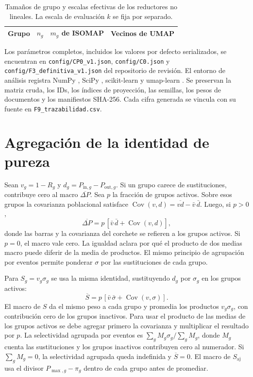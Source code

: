 \begin{table}[!htbp]
\centering
\caption{Tamaños de grupo y escalas efectivas de los reductores no lineales. La escala de evaluación $k$ se fija por separado.}
\label{tab:config}
\small
\begin{tabular}{lrrr}
\toprule
Grupo & $n_g$ & $m_g$ de ISOMAP & Vecinos de UMAP\\
\midrule

\end{tabular}
\end{table}

Los parámetros completos, incluidos los valores por defecto serializados, se encuentran en \nolinkurl{config/CP0_v1.json}, \nolinkurl{config/C0.json} y \nolinkurl{config/F3_definitiva_v1.json} del repositorio de revisión. El entorno de análisis registra NumPy , SciPy , scikit-learn  y umap-learn . Se preservan la matriz cruda, los IDs, los índices de proyección, las semillas, los pesos de documentos y los manifiestos SHA-256. Cada cifra generada se vincula con su fuente en \nolinkurl{F9_trazabilidad.csv}.

\section{Agregación de la identidad de pureza}\label{ap:identidad}
Sean $v_g=1-R_g$ y $d_g=P_{\mathrm{in},g}-P_{\mathrm{out},g}$. Si un grupo carece de sustituciones, contribuye cero al macro $\overline{\Delta P}$. Sea $p$ la fracción de grupos activos. Sobre esos grupos la covarianza poblacional satisface $\operatorname{Cov}(v,d)=\overline{vd}-\bar v\,\bar d$. Luego, si $p>0$,
\[
 \overline{\Delta P}=p\,\left[\bar v\,\bar d+\operatorname{Cov}(v,d)\right],
\]
donde las barras y la covarianza del corchete se refieren a los grupos activos. Si $p=0$, el macro vale cero. La igualdad aclara por qué el producto de dos medias macro puede diferir de la media de productos. El mismo principio de agrupación por eventos permite ponderar $\sigma$ por las sustituciones de cada grupo.

Para $S_g=v_g\sigma_g$ se usa la misma identidad, sustituyendo $d_g$ por $\sigma_g$ en los grupos activos:
\[
 \overline S=p\,\left[\bar v\,\bar\sigma+\operatorname{Cov}(v,\sigma)\right].
\]
El macro de $S$ da el mismo peso a cada grupo y promedia los productos $v_g\sigma_g$, con contribución cero de los grupos inactivos. Para usar el producto de las medias de los grupos activos se debe agregar primero la covarianza y multiplicar el resultado por $p$. La selectividad agrupada por eventos es $\sum_g M_g\sigma_g/\sum_g M_g$, donde $M_g$ cuenta las sustituciones y los grupos inactivos contribuyen cero al numerador. Si $\sum_g M_g=0$, la selectividad agrupada queda indefinida y $\overline S=0$. El macro de $S_{\mathrm{aj}}$ usa el divisor $P_{\max,g}-\pi_g$ dentro de cada grupo antes de promediar.
